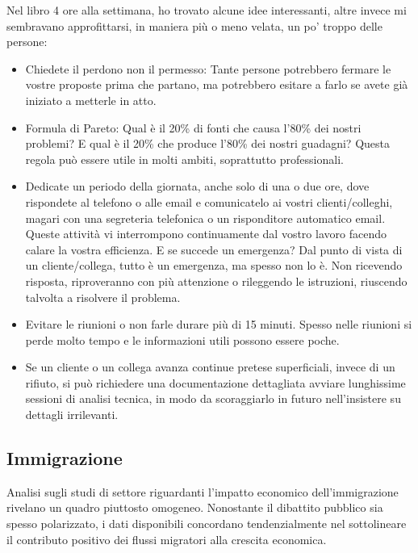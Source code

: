 \documentclass[12pt]{book} %
\begin{document}
\begin{mdframed}[linewidth=1pt]
Nel libro 4 ore alla settimana, ho trovato alcune idee interessanti, altre invece mi sembravano approfittarsi, in maniera più o meno velata, un po' troppo delle persone:

\begin{itemize}
\item Chiedete il perdono non il permesso: Tante persone potrebbero fermare le vostre proposte prima che partano, ma potrebbero esitare a farlo se avete già iniziato a metterle in atto.
\item Formula di Pareto: Qual è il 20\% di fonti che causa l'80\% dei nostri problemi? E qual è il 20\% che produce l'80\% dei nostri guadagni? Questa regola può essere utile in molti ambiti, soprattutto professionali.
\item Dedicate un periodo della giornata, anche solo di una o due ore, dove rispondete al telefono o alle email e comunicatelo ai vostri clienti/colleghi, magari con una segreteria telefonica o un risponditore automatico email. Queste
attività vi interrompono continuamente dal vostro lavoro facendo calare la vostra efficienza. E se succede un emergenza? Dal punto di vista di un cliente/collega, tutto è un emergenza, ma spesso non lo è. Non ricevendo risposta, riproveranno con più attenzione o rileggendo le istruzioni, riuscendo talvolta a risolvere il problema.
\item Evitare le riunioni o non farle durare più di 15 minuti. Spesso nelle riunioni si perde molto tempo e le informazioni utili possono essere poche. 
\item Se un cliente o un collega avanza continue pretese superficiali, invece di un rifiuto, si può richiedere una documentazione dettagliata avviare lunghissime sessioni di analisi tecnica, in modo da scoraggiarlo in futuro nell'insistere su dettagli irrilevanti.
\end{itemize}
\end{mdframed}

\subsection{Immigrazione}

Analisi sugli studi di settore riguardanti l'impatto economico dell'immigrazione rivelano un quadro piuttosto omogeneo. Nonostante il dibattito pubblico sia spesso polarizzato, i dati disponibili concordano tendenzialmente nel sottolineare il contributo positivo dei flussi migratori alla crescita economica.
\end{document}

